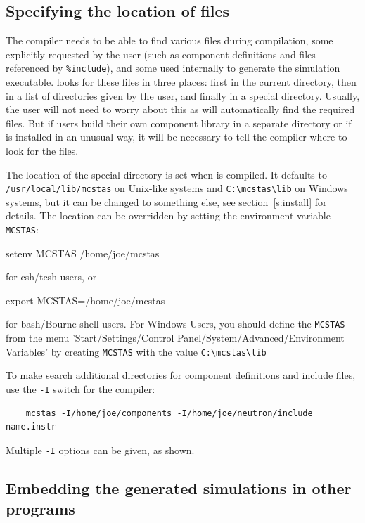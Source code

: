 \subsection{Specifying the location of files}
\label{s:files}

The \MCS compiler needs to be able to find various files during compilation,
some explicitly requested by the user (such as component definitions and files
referenced by \verb+%include+), 
and some used internally to generate the simulation executable. \MCS looks for
these files in three places: first in the current directory, then in a list of
directories given by the user, and finally in a special \MCS
directory. Usually, the user will not need to worry about this as \MCS will
automatically find the required files. But if users build their own component
library in a separate directory or if \MCS is installed in an unusual way, it
will be necessary to tell the compiler where to look for the files.

 The location of the special \MCS directory is set
when \MCS is compiled. It defaults to \verb+/usr/local/lib/mcstas+ on Unix-like
systems and \verb+C:\mcstas\lib+ on Windows systems, but it can be changed to
something else, see section~\ref{s:install} for details. The location can be
overridden by setting the environment variable \verb+MCSTAS+: 
\begin{bash}
    setenv MCSTAS /home/joe/mcstas
\end{bash}
for csh/tcsh users, or
\begin{bash}
    export MCSTAS=/home/joe/mcstas
\end{bash}
for bash/Bourne shell users.  For Windows Users, you should define the
\verb+MCSTAS+ from the menu 'Start/Settings/Control
Panel/System/Advanced/Environment Variables' by creating \verb+MCSTAS+ with the
value \verb+C:\mcstas\lib+

To make \MCS search additional directories for component definitions
and include files, use the \verb+-I+ switch for the \MCS compiler:
\begin{lstlisting}
    mcstas -I/home/joe/components -I/home/joe/neutron/include name.instr
\end{lstlisting}
Multiple \verb+-I+ options can be given, as shown.


\subsection{Embedding the generated simulations in other programs}


